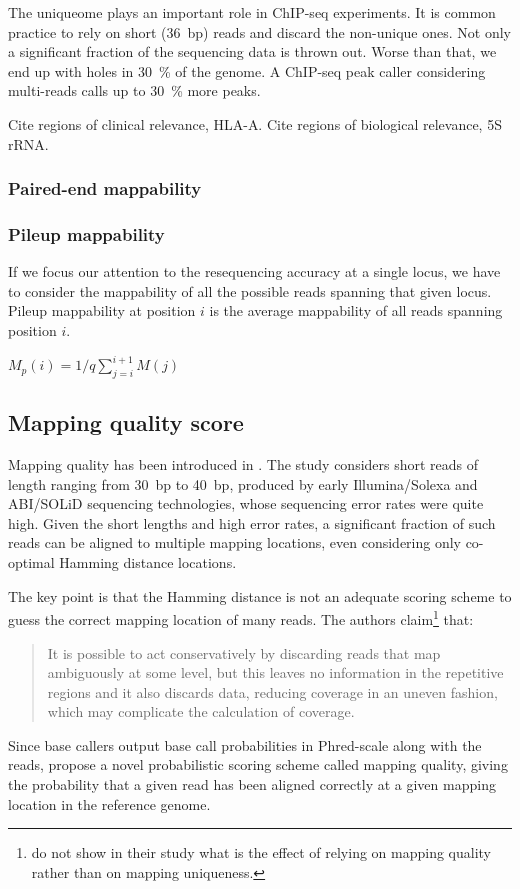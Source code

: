 The uniqueome plays an important role in ChIP-seq experiments.
It is common practice \citep{?} to rely on short (36~bp) reads and discard the non-unique ones.
Not only a significant fraction of the sequencing data is thrown out.
Worse than that, we end up with holes in 30~\% of the genome.
A ChIP-seq peak caller considering multi-reads calls up to 30~\% more peaks.

Cite regions of clinical relevance, \eg HLA-A.
Cite regions of biological relevance, \eg 5S rRNA.

\subsubsection{Paired-end mappability}

\subsubsection{Pileup mappability}

If we focus our attention to the resequencing accuracy at a single locus, we have to consider the mappability of all the possible reads spanning that given locus.
Pileup mappability \citep{Derrien2012} at position $i$ is the average mappability of all reads spanning position $i$.

$M_p(i) = 1/q \sum_{j=i}^{i+1}{M(j)}$


\subsection{Mapping quality score}
\label{sub:mapqual}

Mapping quality has been introduced in \citep{Li2008}.
The study considers short reads of length ranging from 30~bp to 40~bp, produced by early Illumina/Solexa and ABI/SOLiD sequencing technologies, whose sequencing error rates were quite high.
Given the short lengths and high error rates, a significant fraction of such reads can be aligned to multiple mapping locations, even considering only co-optimal Hamming distance locations.

The key point is that the Hamming distance is not an adequate scoring scheme to guess the correct mapping location of many reads.
The authors claim\footnote{\citeauthor{Li2008} do not show in their study what is the effect of relying on mapping quality rather than on mapping uniqueness.} that:
\begin{quote}It is possible to act conservatively by discarding reads that map ambiguously at some level, but this leaves no information in the repetitive regions and it also discards data, reducing coverage in an uneven fashion, which may complicate the calculation of coverage.\end{quote}
Since base callers output base call probabilities in Phred-scale along with the reads, \citeauthor{Li2008} propose a novel probabilistic scoring scheme called mapping quality, giving the probability that a given read has been aligned correctly at a given mapping location in the reference genome.

